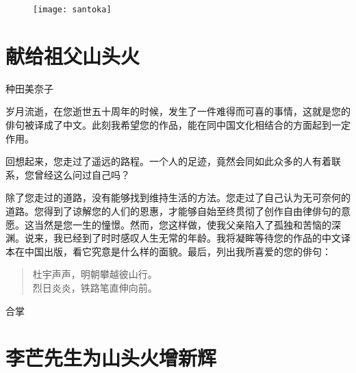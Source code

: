 
\begin{figure}
    \texttt{[image: santoka]}
\end{figure}

\chapter{\FK 献给祖父山头火}

{\FS

    \hfill 种田美奈子\footnotemark[1]

    \bigskip

    岁月流逝，在您逝世五十周年的时候，发生了一件难得而可喜的事情，这就是您的俳句被译成了中文。此刻我希望您的作品，能在同中国文化相结合的方面起到一定作用。

    回想起来，您走过了遥远的路程。一个人的足迹，竟然会同如此众多的人有着联系，您曾经这么问过自己吗？

    除了您走过的道路，没有能够找到维持生活的方法。您走过了自己认为无可奈何的道路。您得到了谅解您的人们的恩惠，才能够自始至终贯彻了创作自由律俳句\footnotemark[2]的意愿。这当然是您一生的憧憬。然而，您这样做，使我父亲陷入了孤独和苦恼的深渊\footnotemark[3]。说来，我已经到了时时感叹人生无常的年龄。我将凝眸等待您的作品的中文译本在中国出版，看它究意是什么样的面貌。最后，列出我所喜爱的您的俳句：

    \begin{quote}
        杜宇声声，明朝攀越彼山行。\\
        烈日炎炎，铁路笔直伸向前。
    \end{quote}

    \hfill 合掌

}

\chapter{\FK 李芒先生为山头火增新辉}

